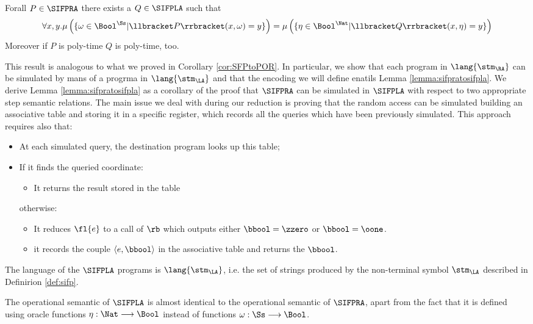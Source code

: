 \begin{lemma}
  \label{lemma:sifpratosifpla}
  Forall $P \in \SIFPRA$ there exists a $Q \in \SIFPLA$ such that
  $$
  \forall x, y. \mu\left(\{\omega \in \Bool^\Ss| \llbracket P\rrbracket (x, \omega)= y\}\right)=
                \mu\left(\{\eta \in \Bool^\Nat| \llbracket Q \rrbracket(x, \eta)= y\}\right)
  $$
  Moreover if $P$ is poly-time $Q$ is poly-time, too.
\end{lemma}

This result is analogous to what we proved in Corollary \ref{cor:SFPtoPOR}.
%
In particular, we show that each program in $\lang{\stm_\RA}$
can be simulated by mans of a progrma in $\lang{\stm_\LA}$ and that
the encoding we will define enatils Lemma \ref{lemma:sifpratosifpla}.
%
We derive Lemma \ref{lemma:sifpratosifpla} as a corollary of the proof that
$\SIFPRA$ can be simulated in $\SIFPLA$ with respect to two appropriate
step semantic relations.
%
The main issue we deal with during our reduction is proving that the
random access can be simulated building an associative table and storing it in
a specific register, which records all the queries which have been previously
simulated. This approach requires also that:
\begin{itemize}
  \item At each simulated query,
  the destination program looks up this table;
  \item If it finds the queried coordinate:
  \begin{itemize}
    \item It returns the result stored in the table
  \end{itemize}
  otherwise:
  \begin{itemize}
    \item It reduces $\fl{e}$ to a call of $\rb$ which outputs either $\bbool=\zzero$ or
    $\bbool=\oone$.
    \item it records the couple $\langle e,\bbool\rangle$ in
   the associative table and returns the $\bbool$.
  \end{itemize}
\end{itemize}


\begin{defn}[$\SIFPLA$]
  The language of the $\SIFPLA$ programs is $\lang{\stm_\LA}$,
  i.e. the set of strings produced by the non-terminal symbol $\stm_\LA$
  described in Definirion \ref{def:sifp}.
\end{defn}

The operational semantic of $\SIFPLA$ is almost identical to the
operational semantic of $\SIFPRA$, apart from the fact that it is
defined using oracle functions $\eta: \Nat \longrightarrow \Bool$ instead of
functions $\omega: \Ss \longrightarrow \Bool$.

